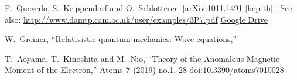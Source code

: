 \begin{thebibliography}{999}
F.~Quevedo, S.~Krippendorf and O.~Schlotterer,
[arXiv:1011.1491 [hep-th]].
See also: \url{http://www.damtp.cam.ac.uk/user/examples/3P7.pdf}
\href{https://drive.google.com/file/d/1HpTXflJToqHr6cEa2b3IkWQ8E1MTjp_v/view?usp=sharing}{Google Drive}

W.~Greiner,
``Relativistic quantum mechanics: Wave equations,''

T.~Aoyama, T.~Kinoshita and M.~Nio,
``Theory of the Anomalous Magnetic Moment of the Electron,''
Atoms \textbf{7} (2019) no.1, 28
doi:10.3390/atoms7010028
\end{thebibliography}




